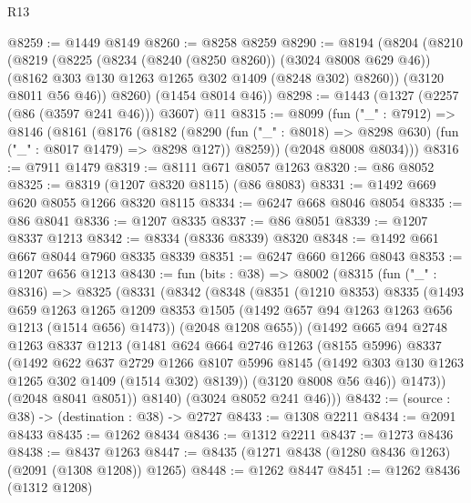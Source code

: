 \begin{lexlean}{R13}
\begin{coremodule}
@8259 := @1449 @8149
@8260 := @8258 @8259
@8290 := @8194
    (@8204
      (@8210
        (@8219
          (@8225
            (@8234 (@8240 (@8250 @8260)) (@3024 @8008 @629 @46))
            (@8162 @303 @130 @1263 @1265 @302 @1409 (@8248 @302) @8260))
          (@3120 @8011 @56 @46))
        @8260)
      (@1454 @8014 @46))
@8298 := @1443 (@1327 (@2257 (@86 (@3597 @241 @46))) @3607) @11
@8315 := @8099
    (fun ("_" : @7912) =>
    @8146
      (@8161
        (@8176
          (@8182
            (@8290 (fun ("_" : @8018) => @8298 @630) (fun ("_" : @8017 @1479) => @8298 @127))
            @8259))
        (@2048 @8008 @8034)))
@8316 := @7911 @1479
@8319 := @8111 @671 @8057 @1263
@8320 := @86 @8052
@8325 := @8319 (@1207 @8320 @8115) (@86 @8083)
@8331 := @1492 @669 @620 @8055 @1266 @8320 @8115
@8334 := @6247 @668 @8046 @8054
@8335 := @86 @8041
@8336 := @1207 @8335
@8337 := @86 @8051
@8339 := @1207 @8337 @1213
@8342 := @8334 (@8336 @8339) @8320
@8348 := @1492 @661 @667 @8044 @7960 @8335 @8339
@8351 := @6247 @660 @1266 @8043
@8353 := @1207 @656 @1213
@8430 := fun (bits : @38) =>
  @8002
    (@8315
      (fun ("_" : @8316) =>
      @8325
        (@8331
          (@8342
            (@8348
              (@8351
                (@1210 @8353)
                @8335
                (@1493
                  @659
                  @1263
                  @1265
                  @1209
                  @8353
                  @1505
                  (@1492 @657 @94 @1263 @1263 @656 @1213 (@1514 @656) @1473))
                (@2048 @1208 @655))
              (@1492
                @665
                @94
                @2748
                @1263
                @8337
                @1213
                (@1481
                  @624
                  @664
                  @2746
                  @1263
                  (@8155 @5996)
                  @8337
                  (@1492
                    @622
                    @637
                    @2729
                    @1266
                    @8107
                    @5996
                    @8145
                    (@1492 @303 @130 @1263 @1265 @302 @1409 (@1514 @302) @8139))
                  (@3120 @8008 @56 @46))
                @1473))
            (@2048 @8041 @8051))
          @8140)
        (@3024 @8052 @241 @46)))
@8432 := (source : @38) -> (destination : @38) -> @2727
@8433 := @1308 @2211
@8434 := @2091 @8433
@8435 := @1262 @8434
@8436 := @1312 @2211
@8437 := @1273 @8436
@8438 := @8437 @1263
@8447 := @8435 (@1271 @8438 (@1280 @8436 @1263) (@2091 (@1308 @1208)) @1265)
@8448 := @1262 @8447
@8451 := @1262 @8436 (@1312 @1208)

\end{coremodule}
\end{lexlean}
